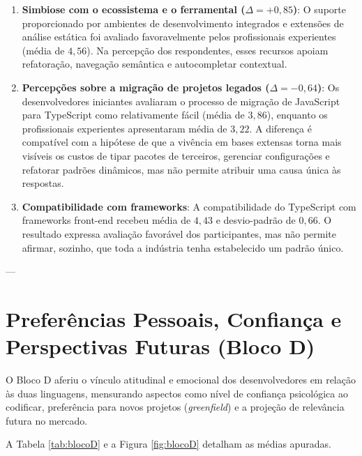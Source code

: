 \begin{enumerate}
    \item \textbf{Simbiose com o ecossistema e o ferramental ($\Delta = +0,85$)}: O suporte proporcionado por ambientes de desenvolvimento integrados e extensões de análise estática foi avaliado favoravelmente pelos profissionais experientes (média de $4,56$). Na percepção dos respondentes, esses recursos apoiam refatoração, navegação semântica e autocompletar contextual.
    
    \item \textbf{Percepções sobre a migração de projetos legados ($\Delta = -0,64$)}: Os desenvolvedores iniciantes avaliaram o processo de migração de JavaScript para TypeScript como relativamente fácil (média de $3,86$), enquanto os profissionais experientes apresentaram média de $3,22$. A diferença é compatível com a hipótese de que a vivência em bases extensas torna mais visíveis os custos de tipar pacotes de terceiros, gerenciar configurações e refatorar padrões dinâmicos, mas não permite atribuir uma causa única às respostas.
    
    \item \textbf{Compatibilidade com frameworks}: A compatibilidade do TypeScript com frameworks front-end recebeu média de $4,43$ e desvio-padrão de $0,66$. O resultado expressa avaliação favorável dos participantes, mas não permite afirmar, sozinho, que toda a indústria tenha estabelecido um padrão único.
\end{enumerate}

---

\section{Preferências Pessoais, Confiança e Perspectivas Futuras (Bloco D)}
\label{sec:preferencias}

O Bloco D aferiu o vínculo atitudinal e emocional dos desenvolvedores em relação às duas linguagens, mensurando aspectos como nível de confiança psicológica ao codificar, preferência para novos projetos (\textit{greenfield}) e a projeção de relevância futura no mercado.

A Tabela \ref{tab:blocoD} e a Figura \ref{fig:blocoD} detalham as médias apuradas.

